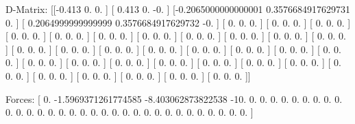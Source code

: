D-Matrix:
[[-0.413               0.                  0.                ]
 [ 0.413               0.                 -0.                ]
 [-0.2065000000000001  0.3576684917629731  0.                ]
 [ 0.2064999999999999  0.3576684917629732 -0.                ]
 [ 0.                  0.                  0.                ]
 [ 0.                  0.                  0.                ]
 [ 0.                  0.                  0.                ]
 [ 0.                  0.                  0.                ]
 [ 0.                  0.                  0.                ]
 [ 0.                  0.                  0.                ]
 [ 0.                  0.                  0.                ]
 [ 0.                  0.                  0.                ]
 [ 0.                  0.                  0.                ]
 [ 0.                  0.                  0.                ]
 [ 0.                  0.                  0.                ]
 [ 0.                  0.                  0.                ]
 [ 0.                  0.                  0.                ]
 [ 0.                  0.                  0.                ]
 [ 0.                  0.                  0.                ]
 [ 0.                  0.                  0.                ]
 [ 0.                  0.                  0.                ]
 [ 0.                  0.                  0.                ]
 [ 0.                  0.                  0.                ]
 [ 0.                  0.                  0.                ]
 [ 0.                  0.                  0.                ]
 [ 0.                  0.                  0.                ]
 [ 0.                  0.                  0.                ]
 [ 0.                  0.                  0.                ]
 [ 0.                  0.                  0.                ]
 [ 0.                  0.                  0.                ]
 [ 0.                  0.                  0.                ]
 [ 0.                  0.                  0.                ]
 [ 0.                  0.                  0.                ]
 [ 0.                  0.                  0.                ]
 [ 0.                  0.                  0.                ]
 [ 0.                  0.                  0.                ]]

Forces:
[  0.                  -1.5969371261774585  -8.403062873822538
 -10.                   0.                   0.
   0.                   0.                   0.
   0.                   0.                   0.
   0.                   0.                   0.
   0.                   0.                   0.
   0.                   0.                   0.
   0.                   0.                   0.
   0.                   0.                   0.
   0.                   0.                   0.
   0.                   0.                   0.
   0.                   0.                   0.                ]

